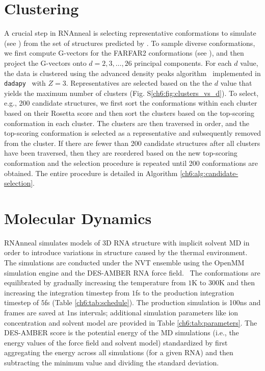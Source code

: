 \section{Clustering}
{}
\label{ch6:methods:representatives}

A crucial step in RNAnneal is selecting representative conformations to simulate (see ) from the set of structures predicted by . To sample diverse conformations, we first compute G-vectors for the FARFAR2 conformations (see ), and then project the G-vectors onto $d=2,3,\ldots,26$ principal components. For each $d$ value, the data is clustered using the advanced density peaks algorithm~\cite{d2021automatic} implemented in \texttt{dadapy}~\cite{glielmo2022dadapy} with $Z=3$. Representatives are selected based on the the $d$ value that yields the maximum number of clusters (Fig. S\ref{ch6:fig:clusters_vs_d}). To select, e.g., 200 candidate structures, we first sort the conformations within each cluster based on their Rosetta score and then sort the clusters based on the top-scoring conformation in each cluster. The clusters are then traversed in order, and the top-scoring conformation is selected as a representative and subsequently removed from the cluster. If there are fewer than 200 candidate structures after all clusters have been traversed, then they are reordered based on the new top-scoring conformation and the selection procedure is repeated until 200 conformations are obtained. The entire procedure is detailed in Algorithm \ref{ch6:alg:candidate-selection}.

\section{Molecular Dynamics}
{}
\label{ch6:methods:molecular-dynamics}

RNAnneal simulates models of 3D RNA structure with implicit solvent MD in order to introduce variations in structure caused by the thermal environment. The simulations are conducted under the NVT ensemble using the OpenMM simulation engine and the DES-AMBER RNA force field.~\cite{eastman2023openmm,DE-Shaw-RNA-ff} The conformations are equilibrated by gradually increasing the temperature from $1$K to $300$K and then increasing the integration timestep from $1$fs to the production integration timestep of $5$fs (Table \ref{ch6:tab:schedule}). The production simulation is 100ns and frames are saved at 1ns intervals; additional simulation parameters like ion concentration and solvent model are provided in Table \ref{ch6:tab:parameters}. The DES-AMBER score is the potential energy of the MD simulations (i.e., the energy values of the force field and solvent model) standardized by first aggregating the energy across all simulations (for a given RNA) and then subtracting the minimum value and dividing the standard deviation.

